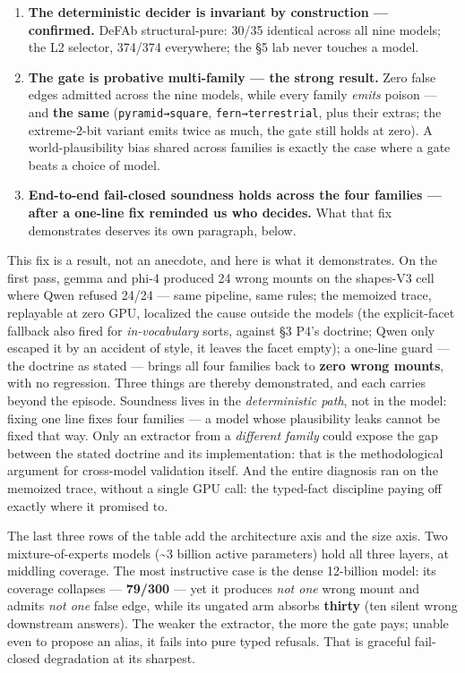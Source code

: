 \documentclass[11pt]{article}
\begin{document}
\begin{enumerate}
\item \textbf{The deterministic decider is invariant by construction — confirmed.} DeFAb structural-pure: 30/35 identical across all nine models; the L2 selector, 374/374 everywhere; the §5 lab never touches a model.
\item \textbf{The gate is probative multi-family — the strong result.} Zero false edges admitted across the nine models, while every family \emph{emits} poison — and \textbf{the same} (\texttt{pyramid→square}, \texttt{fern→terrestrial}, plus their extras; the extreme-2-bit variant emits twice as much, the gate still holds at zero). A world-plausibility bias shared across families is exactly the case where a gate beats a choice of model.
\item \textbf{End-to-end fail-closed soundness holds across the four families — after a one-line fix reminded us who decides.} What that fix demonstrates deserves its own paragraph, below.
\end{enumerate}

This fix is a result, not an anecdote, and here is what it demonstrates. On the first pass, gemma and phi-4 produced 24 wrong mounts on the shapes-V3 cell where Qwen refused 24/24 — same pipeline, same rules; the memoized trace, replayable at zero GPU, localized the cause outside the models (the explicit-facet fallback also fired for \emph{in-vocabulary} sorts, against §3 P4's doctrine; Qwen only escaped it by an accident of style, it leaves the facet empty); a one-line guard — the doctrine as stated — brings all four families back to \textbf{zero wrong mounts}, with no regression. Three things are thereby demonstrated, and each carries beyond the episode. Soundness lives in the \emph{deterministic path}, not in the model: fixing one line fixes four families — a model whose plausibility leaks cannot be fixed that way. Only an extractor from a \emph{different family} could expose the gap between the stated doctrine and its implementation: that is the methodological argument for cross-model validation itself. And the entire diagnosis ran on the memoized trace, without a single GPU call: the typed-fact discipline paying off exactly where it promised to.

The last three rows of the table add the architecture axis and the size axis. Two mixture-of-experts models (\textasciitilde{}3 billion active parameters) hold all three layers, at middling coverage. The most instructive case is the dense 12-billion model: its coverage collapses — \textbf{79/300} — yet it produces \emph{not one} wrong mount and admits \emph{not one} false edge, while its ungated arm absorbs \textbf{thirty} (ten silent wrong downstream answers). The weaker the extractor, the more the gate pays; unable even to propose an alias, it fails into pure typed refusals. That is graceful fail-closed degradation at its sharpest.
\end{document}
